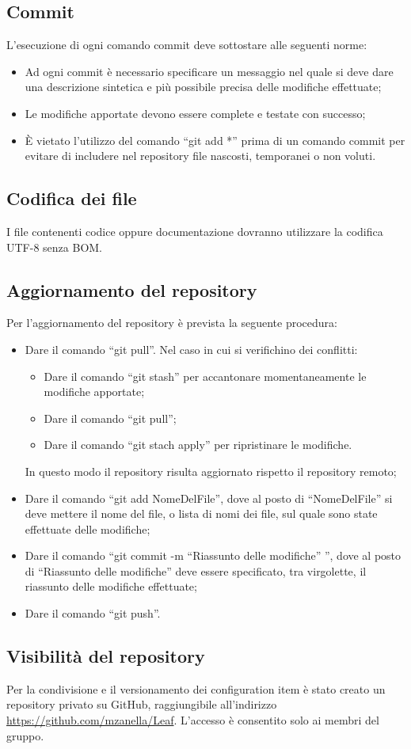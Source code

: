 \documentclass[../NormeProgetto.tex]{subfiles}
\begin{document}
	\subsection{Commit}
	L'esecuzione di ogni comando commit deve sottostare alle seguenti norme:
	\begin{itemize}
		\item Ad ogni commit è necessario specificare un messaggio nel quale si deve dare una descrizione sintetica e più possibile precisa delle modifiche effettuate;
		\item Le modifiche apportate devono essere complete e testate con successo;
		\item È vietato l'utilizzo del comando ``git add *'' prima di un comando commit per evitare di includere nel repository file nascosti, temporanei o non voluti.
	\end{itemize}
	\subsection{Codifica dei file}
	I file contenenti codice oppure documentazione dovranno utilizzare la codifica UTF-8 senza BOM.
	\subsection{Aggiornamento del repository}
	Per l'aggiornamento del repository è prevista la seguente procedura:
	\begin{itemize}
		\item Dare il comando ``git pull''. Nel caso in cui si verifichino dei conflitti:
			\begin{itemize}
			\item Dare il comando ``git stash'' per accantonare momentaneamente le modifiche apportate;
			\item Dare il comando ``git pull'';
			\item Dare il comando ``git stach apply'' per ripristinare le modifiche.
			\end{itemize}
		In questo modo il repository risulta aggiornato rispetto il repository remoto;
		\item Dare il comando ``git add NomeDelFile'', dove al posto di ``NomeDelFile'' si deve mettere il nome del file, o lista di nomi dei file, sul quale sono state effettuate delle modifiche;
		\item Dare il comando ``git commit -m ``Riassunto delle modifiche'' '', dove al posto di ``Riassunto delle modifiche'' deve essere specificato, tra virgolette, il riassunto delle modifiche effettuate;
		\item Dare il comando ``git push''.
	\end{itemize}
	\subsection{Visibilità del repository}
	Per la condivisione e il versionamento dei configuration item è stato creato un repository privato su GitHub, raggiungibile all'indirizzo \url{https://github.com/mzanella/Leaf}. L'accesso è consentito solo ai membri del gruppo.
\end{document}

